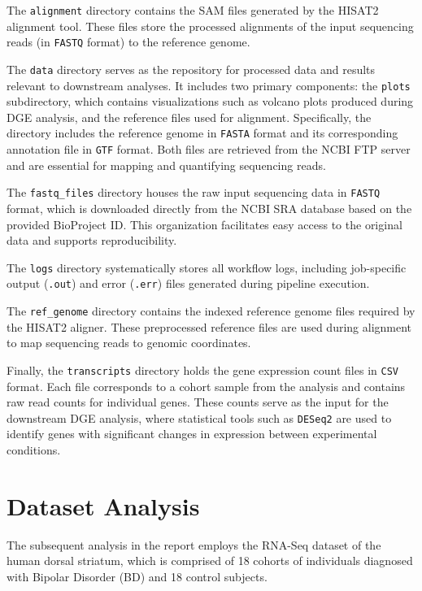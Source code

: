\documentclass{article}
\begin{document}
The \texttt{alignment} directory contains the SAM files generated by the HISAT2 alignment tool. These files store the processed alignments of the input sequencing reads (in \texttt{FASTQ} format) to the reference genome.

The \texttt{data} directory serves as the repository for processed data and results relevant to downstream analyses. It includes two primary components: the \texttt{plots} subdirectory, which contains visualizations such as volcano plots produced during DGE analysis, and the reference files used for alignment. Specifically, the directory includes the reference genome in \texttt{FASTA} format and its corresponding annotation file in \texttt{GTF} format. Both files are retrieved from the NCBI FTP server and are essential for mapping and quantifying sequencing reads.

The \texttt{fastq\_files} directory houses the raw input sequencing data in \texttt{FASTQ} format, which is downloaded directly from the NCBI SRA database based on the provided BioProject ID. This organization facilitates easy access to the original data and supports reproducibility.

The \texttt{logs} directory systematically stores all workflow logs, including job-specific output (\texttt{.out}) and error (\texttt{.err}) files generated during pipeline execution.

The \texttt{ref\_genome} directory contains the indexed reference genome files required by the HISAT2 aligner. These preprocessed reference files are used during alignment to map sequencing reads to genomic coordinates.

Finally, the \texttt{transcripts} directory holds the gene expression count files in \texttt{CSV} format. Each file corresponds to a cohort sample from the analysis and contains raw read counts for individual genes. These counts serve as the input for the downstream DGE analysis, where statistical tools such as \texttt{DESeq2} are used to identify genes with significant changes in expression between experimental conditions.

\newpage

\section{Dataset Analysis}
The subsequent analysis in the report employs the RNA-Seq dataset of the human dorsal striatum, which is comprised of 18 cohorts of individuals diagnosed with Bipolar Disorder (BD) and 18 control subjects.
\end{document}
